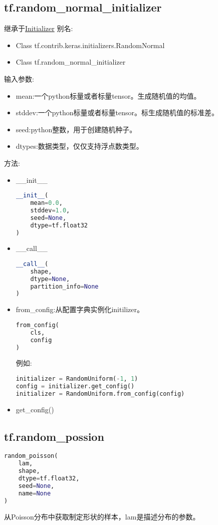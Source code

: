 \subsection{\textbf{tf.random\_normal\_initializer}}
继承于\href{https://www.tensorflow.org/api_docs/python/tf/contrib/keras/initializers/Initializer}{Initializer}
别名:
\begin{itemize}
\item Class tf.contrib.keras.initializers.RandomNormal
\item Class tf.random\_normal\_initializer
\end{itemize}
输入参数:
\begin{itemize}
\item mean:一个python标量或者标量tensor。生成随机值的均值。
\item stddev:一个python标量或者标量tensor。标生成随机值的标准差。
\item seed:python整数，用于创建随机种子。
\item dtypes:数据类型，仅仅支持浮点数类型。
\end{itemize}
方法:
\begin{itemize}
\item \_\_init\_\_
\begin{lstlisting}[language=Python]
__init__(
    mean=0.0,
    stddev=1.0,
    seed=None,
    dtype=tf.float32
)
\end{lstlisting}
\item \_\_call\_\_
\begin{lstlisting}[language=Python]
__call__(
    shape,
    dtype=None,
    partition_info=None
)
\end{lstlisting}
\item from\_config:从配置字典实例化initilizer。
\begin{lstlisting}[language=Python]
from_config(
    cls,
    config
)
\end{lstlisting}
例如:
\begin{lstlisting}[language=Python]
initializer = RandomUniform(-1, 1)
config = initializer.get_config()
initializer = RandomUniform.from_config(config)
\end{lstlisting}
\item get\_config()
\end{itemize}
\subsection{tf.random\_possion}
\begin{lstlisting}[language=Python]
random_poisson(
    lam,
    shape,
    dtype=tf.float32,
    seed=None,
    name=None
)
\end{lstlisting}
从Poisson分布中获取制定形状的样本，lam是描述分布的参数。

